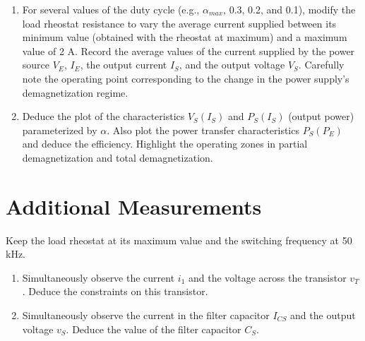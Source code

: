 \begin{enumerate}
\item For several values of the duty cycle (e.g., $\alpha_{max}$, 0.3, 0.2, and 0.1), modify the load rheostat resistance to vary the average current supplied between its minimum value (obtained with the rheostat at maximum) and a maximum value of 2 A. Record the average values of the current supplied by the power source $V_E$, $I_E$, the output current $I_S$, and the output voltage $V_S$. Carefully note the operating point corresponding to the change in the power supply's demagnetization regime.
\item Deduce the plot of the characteristics $V_S(I_S)$ and $P_S(I_S)$ (output power) parameterized by $\alpha$. Also plot the power transfer characteristics $P_S(P_E)$ and deduce the efficiency. Highlight the operating zones in partial demagnetization and total demagnetization.

\end{enumerate}

\section{Additional Measurements}

Keep the load rheostat at its maximum value and the switching frequency at 50 kHz.

\begin{enumerate}
\item Simultaneously observe the current $i_1$ and the voltage across the transistor $v_T$. Deduce the constraints on this transistor.%
\item Simultaneously observe the current in the filter capacitor $I_{CS}$ and the output voltage $v_S$. Deduce the value of the filter capacitor $C_S$.
\end{enumerate}
